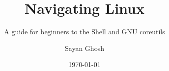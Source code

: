 \documentclass[
	a5paper, %
	fontsize=10pt, %
	twoside=true, %
	numbers=noenddot, %
]{kaobook}
\begin{document}


\title{Navigating Linux}
\subtitle{A guide for beginners to the Shell and GNU coreutils}

\author{Sayan Ghosh}

\date{\today}

\publishers{IIT Madras \\ BS Data Science and Applications}


\frontmatter %




\makeatletter
\uppertitleback{\@titlehead} %
\end{document}
